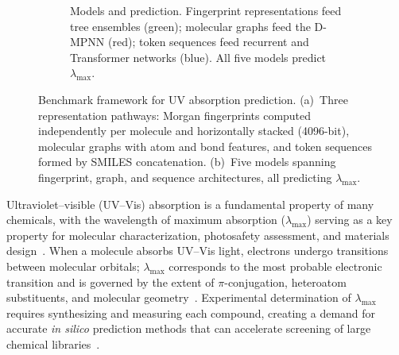 \documentclass[11pt,a4paper]{article}
\begin{document}
\begin{figure}[!ht]
\begin{subfigure}[b]{\textwidth}
    \caption{Models and prediction. Fingerprint representations feed tree ensembles (green); molecular graphs feed the D-MPNN (red); token sequences feed recurrent and Transformer networks (blue). All five models predict $\lambda_{\max}$.}
    \label{fig:framework_models}
    \end{subfigure}

    \caption{Benchmark framework for UV absorption prediction. (a)~Three representation pathways: Morgan fingerprints computed independently per molecule and horizontally stacked (4096-bit), molecular graphs with atom and bond features, and token sequences formed by SMILES concatenation. (b)~Five models spanning fingerprint, graph, and sequence architectures, all predicting $\lambda_{\max}$.}
    \label{fig:benchmark_framework}
\end{figure}

Ultraviolet--visible (UV--Vis) absorption is a fundamental property of many chemicals, with the wavelength of maximum absorption ($\lambda_{\max}$) serving as a key property for molecular characterization, photosafety assessment, and materials design~\cite{flemingMolecular2010}.
When a molecule absorbs UV--Vis light, electrons undergo transitions between molecular orbitals; $\lambda_{\max}$ corresponds to the most probable electronic transition and is governed by the extent of $\pi$-conjugation, heteroatom substituents, and molecular geometry~\cite{reichardt2011solvents}.
Experimental determination of $\lambda_{\max}$ requires synthesizing and measuring each compound, creating a demand for accurate \textit{in silico} prediction methods that can accelerate screening of large chemical libraries~\cite{ghosh2019deep}.
\end{document}
